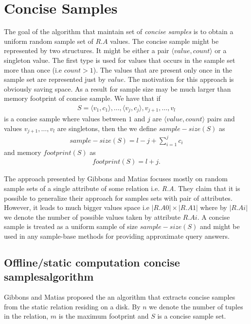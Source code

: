 \section{Concise Samples}
The goal of the algorithm that maintain set of \textit{concise
  samples} is to obtain a uniform random sample set of $R.A$ values.
The concise sample might be represented by two structures. It might be
either a pair $\langle value, count \rangle $ or a singleton value. The first
type is used for values that occurs in the sample set more than once
(i.e $count > 1$). The values that are present only once in the sample
set are represented just by $value$. The motivation for this
approach is obviously saving space. As a result for sample size may be
much larger than memory footprint of concise sample. We have that if 
\begin{align*}
  S = {\langle v_1, c_1 \rangle, \dots, \langle v_j, c_j \rangle,
    v_{j+1}, \dots, v_l }
\end{align*}
is a concise sample where values between $1$ and $j$ are $\langle
value, count \rangle$ pairs and values $v_{j+1}, \dots, v_l$ are
singletons, then the we define $sample-size(S)$ as
\begin{align*}
sample-size(S) = l - j + \sum_{i=1}^j c_i
\end{align*}
and memory $footprint(S)$ as 
\begin{align*}
footprint(S) = l + j.
\end{align*}

The approach presented by Gibbons and Matias focuses mostly on random
sample sets of a single attribute of some relation
i.e. \textit{R.A}. They claim that it is possible to generalize their
approach for samples sets with pair of attributes. However, it
leads to much bigger values space i.e $ |R.A0| \times |R.A1|$
where by $|R.Ai|$ we denote the number of possible values taken by
attribute $R.Ai$. A concise sample is treated as a uniform sample of
size $sample-size(S)$ and might be used in any sample-base methods for
providing approximate query answers.

\subsection{Offline/static computation concise samplesalgorithm}
Gibbons and Matias \cite{GM98} proposed the an algorithm that extracts
concise samples from the static relation residing on a disk.
By $n$ we denote the number of tuples in the relation, $m$ is the
maximum footprint and $S$ is a concise sample set.

